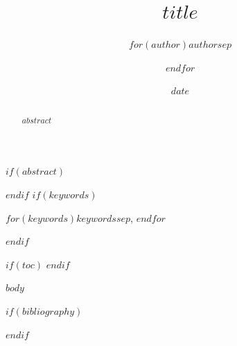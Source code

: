 \documentclass[$if(fontsize)$$fontsize$,$endif$]{IEEEtran}
\title{$title$}
\author{$for(author)$$author$$sep$ \and $endfor$}
\date{$date$}
\begin{document}
$if(abstract)$
\begin{abstract}
$abstract$
\end{abstract}
$endif$
$if(keywords)$
\begin{IEEEkeywords}
$for(keywords)$$keywords$$sep$, $endfor$
\end{IEEEkeywords}
$endif$

\maketitle
$if(toc)$
\tableofcontents
$endif$

$body$

$if(bibliography)$


$endif$
\end{document}
